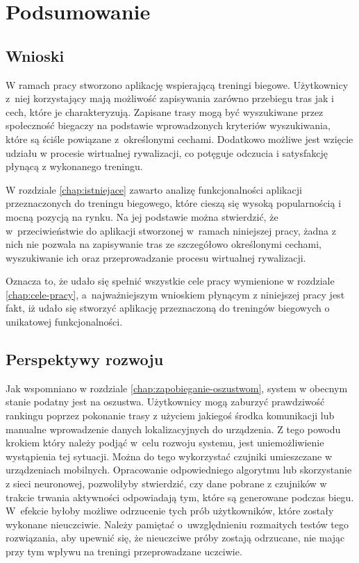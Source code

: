 \chapter{Podsumowanie}\label{chap:introduction}
\section{Wnioski}
W ramach pracy stworzono aplikację wspierającą treningi biegowe. Użytkownicy z~niej korzystający mają możliwość zapisywania zarówno przebiegu tras jak i cech, które je charakteryzują. Zapisane trasy mogą być wyszukiwane przez społeczność biegaczy na podstawie wprowadzonych kryteriów wyszukiwania, które są ściśle powiązane z~określonymi cechami. Dodatkowo możliwe jest wzięcie udziału w procesie wirtualnej rywalizacji, co potęguje odczucia i satysfakcję płynącą z wykonanego treningu. 

W rozdziale \ref{chap:istniejace} zawarto analizę funkcjonalności aplikacji przeznaczonych do treningu biegowego, które cieszą się wysoką popularnością i mocną pozycją na rynku. Na jej podstawie można stwierdzić, że w~przeciwieństwie do aplikacji stworzonej w~ramach niniejszej pracy, żadna z nich nie pozwala na zapisywanie tras ze szczegółowo określonymi cechami, wyszukiwanie ich oraz przeprowadzanie procesu wirtualnej rywalizacji.

Oznacza to, że udało się spełnić wszystkie cele pracy wymienione w rozdziale \ref{chap:cele-pracy}, a~najważniejszym wnioskiem płynącym z niniejszej pracy jest fakt, iż udało się stworzyć aplikację przeznaczoną do treningów biegowych o unikatowej funkcjonalności.

\section{Perspektywy rozwoju}
Jak wspomniano w rozdziale \ref{chap:zapobieganie-oszustwom}, system w obecnym stanie podatny jest na oszustwa. Użytkownicy mogą zaburzyć prawdziwość rankingu poprzez pokonanie trasy z użyciem jakiegoś środka komunikacji lub manualne wprowadzenie danych lokalizacyjnych do urządzenia. Z tego powodu krokiem który należy podjąć w~celu rozwoju systemu, jest uniemożliwienie wystąpienia tej sytuacji. Można do tego wykorzystać czujniki umieszczane w urządzeniach mobilnych. Opracowanie odpowiedniego algorytmu lub skorzystanie z sieci neuronowej, pozwoliłyby stwierdzić, czy dane pobrane z czujników w trakcie trwania aktywności odpowiadają tym, które są generowane podczas biegu. W~efekcie byłoby możliwe odrzucenie tych prób użytkowników, które zostały wykonane nieuczciwie. Należy pamiętać o~uwzględnieniu rozmaitych testów tego rozwiązania, aby upewnić się, że nieuczciwe próby zostają odrzucane, nie mając przy tym wpływu na treningi przeprowadzane uczciwie.